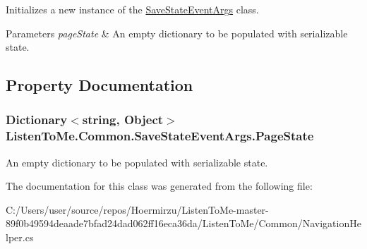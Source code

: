 Initializes a new instance of the \hyperlink{class_listen_to_me_1_1_common_1_1_save_state_event_args}{Save\+State\+Event\+Args} class. 


\begin{DoxyParams}{Parameters}
{\em page\+State} & An empty dictionary to be populated with serializable state.\\
\hline
\end{DoxyParams}


\subsection{Property Documentation}
\subsubsection[{\texorpdfstring{Page\+State}{PageState}}]{\setlength{\rightskip}{0pt plus 5cm}Dictionary$<$string, Object$>$ Listen\+To\+Me.\+Common.\+Save\+State\+Event\+Args.\+Page\+State\hspace{0.3cm}{\ttfamily [get]}}\hypertarget{class_listen_to_me_1_1_common_1_1_save_state_event_args_a190dff500fde23905bd505e403c47be3}{}\label{class_listen_to_me_1_1_common_1_1_save_state_event_args_a190dff500fde23905bd505e403c47be3}


An empty dictionary to be populated with serializable state. 



The documentation for this class was generated from the following file\+:\begin{DoxyCompactItemize}
\item 
C\+:/\+Users/user/source/repos/\+Hoermirzu/\+Listen\+To\+Me-\/master-\/89f0b49594deaade7bfad24dad062ff16eca36da/\+Listen\+To\+Me/\+Common/Navigation\+Helper.\+cs\end{DoxyCompactItemize}
